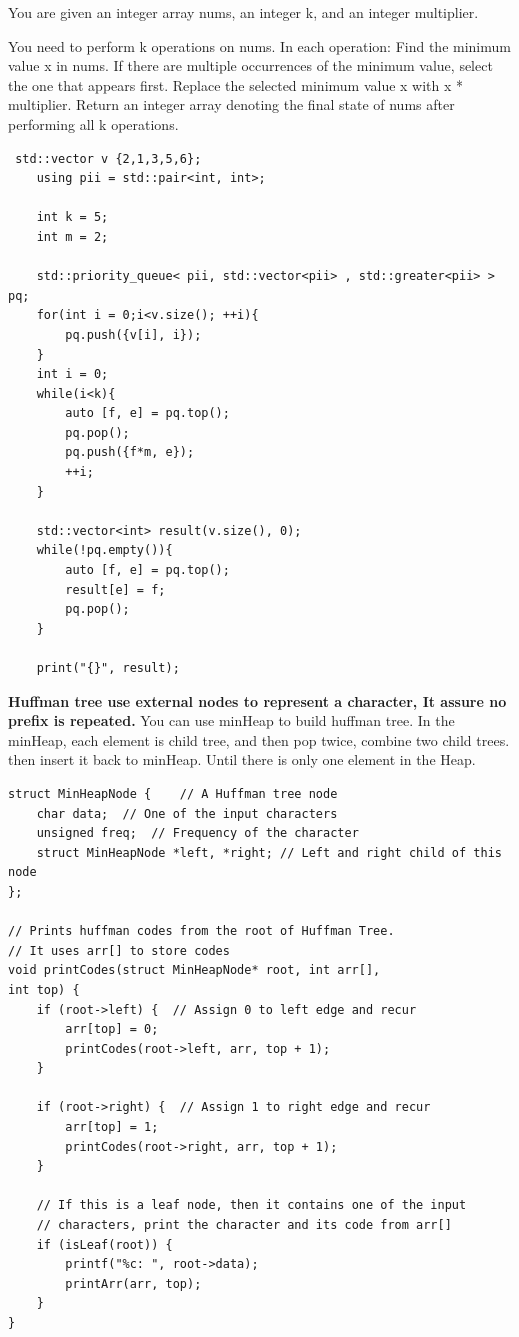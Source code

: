\documentclass[a4paper,11pt,twoside]{book}
\begin{document}
You are given an integer array nums, an integer k, and an integer multiplier.

You need to perform k operations on nums. In each operation: Find the minimum value x in nums. If there are multiple occurrences of the minimum value, select the one that appears first.
Replace the selected minimum value x with x * multiplier.
Return an integer array denoting the final state of nums after performing all k operations.
\begin{lstlisting}
 std::vector v {2,1,3,5,6};
    using pii = std::pair<int, int>;

    int k = 5;
    int m = 2;

    std::priority_queue< pii, std::vector<pii> , std::greater<pii> > pq;
    for(int i = 0;i<v.size(); ++i){
        pq.push({v[i], i});
    }    
    int i = 0;
    while(i<k){
        auto [f, e] = pq.top();
        pq.pop();
        pq.push({f*m, e});
        ++i;
    }

    std::vector<int> result(v.size(), 0);
    while(!pq.empty()){
        auto [f, e] = pq.top();
        result[e] = f;
        pq.pop();
    }

    print("{}", result);
\end{lstlisting}



\par \textbf{Huffman tree use external nodes to represent a character, It assure no prefix is repeated.} You can use minHeap to build huffman tree. In the minHeap, each element is child tree, and then pop twice, combine two child trees. then insert it back to minHeap. Until there is only one element in the Heap. 

\begin{lstlisting}
struct MinHeapNode { 	// A Huffman tree node 
	char data;  // One of the input characters 
	unsigned freq;  // Frequency of the character 
	struct MinHeapNode *left, *right; // Left and right child of this node 
}; 

// Prints huffman codes from the root of Huffman Tree. 
// It uses arr[] to store codes 
void printCodes(struct MinHeapNode* root, int arr[], 
int top) { 
	if (root->left) {  // Assign 0 to left edge and recur 
		arr[top] = 0; 
		printCodes(root->left, arr, top + 1); 
	} 

	if (root->right) {  // Assign 1 to right edge and recur 
		arr[top] = 1; 
		printCodes(root->right, arr, top + 1); 
	} 
	
	// If this is a leaf node, then it contains one of the input 
	// characters, print the character and its code from arr[] 
	if (isLeaf(root)) { 
		printf("%c: ", root->data); 
		printArr(arr, top); 
	} 
} 
\end{lstlisting}
\end{document}
